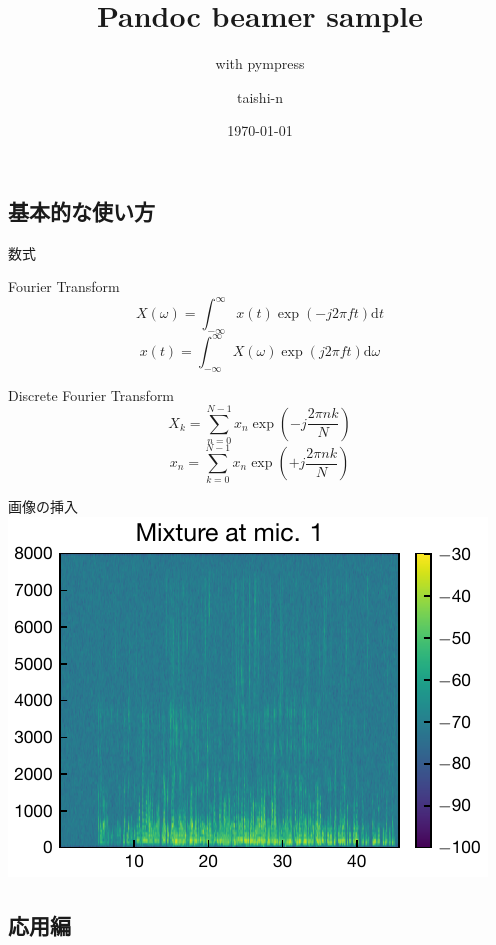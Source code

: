 \documentclass[
  ignorenonframetext,
]{beamer}
\title{Pandoc beamer sample}
\subtitle{with pympress}
\author{taishi-n}
\date{\today}
\institute{qiita}
\begin{document}
\frame{\titlepage}

\subsection{基本的な使い方}\label{ux57faux672cux7684ux306aux4f7fux3044ux65b9}

\begin{frame}{数式}
\label{ux6570ux5f0f}

\begin{block}{Fourier Transform}
\label{fourier-transform}
\[X(\omega) = \int _{-\infty} ^{\infty} x(t) \exp \left(- j{2\pi f t}\right) \mathrm{d}t\]
\[x(t) = \int _{-\infty} ^{\infty} X(\omega) \exp \left( j{2\pi f t}\right) \mathrm{d}\omega\]
\end{block}

\begin{block}{Discrete Fourier Transform}
\label{discrete-fourier-transform}
\[X_k = \sum _{n=0} ^{N-1} x_n \exp \left(- j\frac{2\pi n k}{N} \right)\]
\[x_n = \sum _{k=0} ^{N-1} x_n \exp \left(+ j\frac{2\pi n k}{N} \right)\]
\end{block}
\end{frame}

\begin{frame}{画像の挿入}
\label{ux753bux50cfux306eux633fux5165}
\includegraphics{spec.pdf}
\end{frame}

\subsection{応用編}\label{ux5fdcux7528ux7de8}
\end{document}
